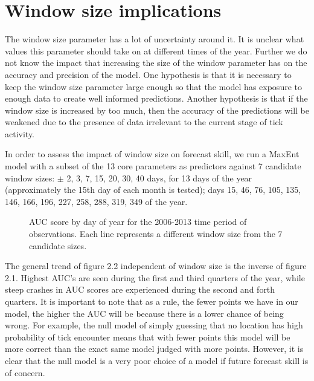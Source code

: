 \section{Window size implications }

\noindent The window size parameter has a lot of uncertainty around it. It is unclear what values this parameter should take on at different times of the year. Further we do not know the impact that increasing the size of the window parameter has on the accuracy and precision of the model. One hypothesis is that it is necessary to keep the window size parameter large enough so that the model has exposure to enough data to create well informed predictions. Another hypothesis is that if the window size is increased by too much, then the accuracy of the predictions will be weakened due to the presence of data irrelevant to the current stage of tick activity. \newline

\noindent In order to assess the impact of window size on forecast skill, we run a MaxEnt model with a subset of the 13 core parameters as predictors against 7 candidate window sizes: $\pm$ 2, 3, 7, 15, 20, 30, 40 days, for 13 days of the year (approximately the 15th day of each month is tested); days 15, 46, 76, 105, 135, 146, 166, 196, 227, 258, 288, 319, 349 of the year. \newline

\begin{figure} [!ht]
\centerline{}
\caption{AUC score by day of year for the 2006-2013 time period of observations. Each line represents a different window size from the 7 candidate sizes. }
\label{fig6}
\end{figure}

\noindent The general trend of figure 2.2 independent of window size is the inverse of figure 2.1. Highest AUC's are seen during the first and third quarters of the year, while steep crashes in AUC scores are experienced during the second and forth quarters. It is important to note that as a rule, the fewer points we have in our model, the higher the AUC will be because there is a lower chance of being wrong. For example, the null model of simply guessing that no location has high probability of tick encounter means that with fewer points this model will be more correct than the exact same model judged with more points. However, it is clear that the null model is a very poor choice of a model if future forecast skill is of concern. \newline

